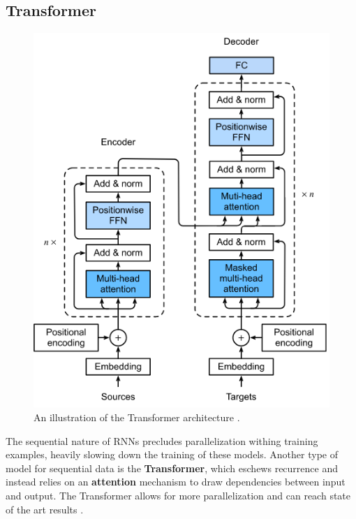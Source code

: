 \documentclass[./main.tex]{subfiles}
\begin{document}
\subsection{Transformer}
\label{sec:Transformer}
\begin{figure}[htbp]
    \centering
    \includegraphics[width = 0.5 \textwidth]{./entities/transformer.PNG}
    \caption{An illustration of the Transformer architecture \cite{d2l}.}
    \label{fig:transformer_illustration}
\end{figure}
\noindent The sequential nature of RNNs precludes parallelization withing training examples, heavily slowing down the training of these models. Another type of model for sequential data is the \textbf{Transformer}, which eschews recurrence and instead relies on an \textbf{attention} mechanism to draw dependencies between input and output. The Transformer allows for more parallelization and can reach state of the art results \cite{https://doi.org/10.48550/arxiv.1706.03762}.
\end{document}
